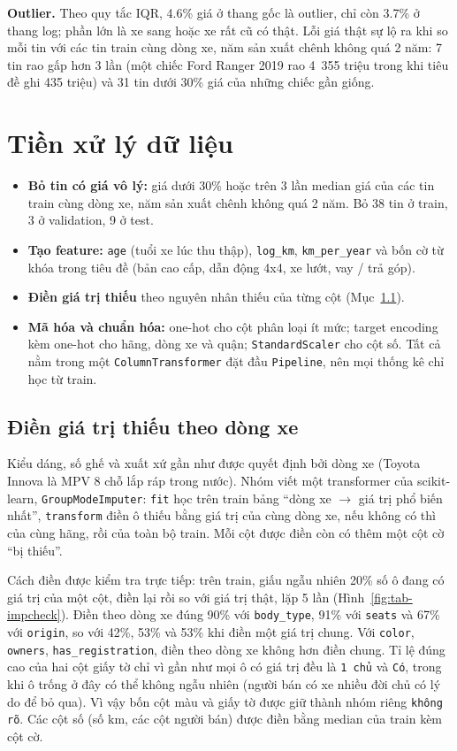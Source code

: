 \textbf{Outlier.} Theo quy tắc IQR, 4.6\% giá ở thang gốc là outlier, chỉ còn 3.7\% ở thang log; phần lớn là xe sang
hoặc xe rất cũ có thật. Lỗi giá thật sự lộ ra khi so mỗi tin với các tin train cùng dòng xe, năm sản xuất chênh không quá
2 năm: 7 tin rao gấp hơn 3 lần (một chiếc Ford Ranger 2019 rao 4~355 triệu trong khi tiêu đề ghi 435 triệu) và 31 tin
dưới 30\% giá của những chiếc gần giống.

\section{Tiền xử lý dữ liệu}\label{sec:tab-prep}

\begin{itemize}
  \item \textbf{Bỏ tin có giá vô lý:} giá dưới 30\% hoặc trên 3 lần median giá của các tin train cùng dòng xe, năm sản
        xuất chênh không quá 2 năm. Bỏ 38 tin ở train, 3 ở validation, 9 ở test.
  \item \textbf{Tạo feature:} \texttt{age} (tuổi xe lúc thu thập), \texttt{log\_km}, \texttt{km\_per\_year} và bốn cờ từ
        khóa trong tiêu đề (bản cao cấp, dẫn động 4x4, xe lướt, vay / trả góp).
  \item \textbf{Điền giá trị thiếu} theo nguyên nhân thiếu của từng cột (Mục~\ref{sec:tab-impute}).
  \item \textbf{Mã hóa và chuẩn hóa:} one-hot cho cột phân loại ít mức; target encoding \cite{tab-te} kèm one-hot cho
        hãng, dòng xe và quận; \texttt{StandardScaler} cho cột số. Tất cả nằm trong một \texttt{ColumnTransformer} đặt đầu
        \texttt{Pipeline}, nên mọi thống kê chỉ học từ train.
\end{itemize}

\subsection{Điền giá trị thiếu theo dòng xe}\label{sec:tab-impute}

Kiểu dáng, số ghế và xuất xứ gần như được quyết định bởi dòng xe (Toyota Innova là MPV 8 chỗ lắp ráp trong nước). Nhóm
viết một transformer của scikit-learn, \texttt{GroupModeImputer}: \texttt{fit} học trên train bảng ``dòng xe $\to$ giá
trị phổ biến nhất'', \texttt{transform} điền ô thiếu bằng giá trị của cùng dòng xe, nếu không có thì của cùng hãng, rồi
của toàn bộ train. Mỗi cột được điền còn có thêm một cột cờ ``bị thiếu''.

Cách điền được kiểm tra trực tiếp: trên train, giấu ngẫu nhiên 20\% số ô đang có giá trị của một cột, điền lại rồi so
với giá trị thật, lặp 5 lần (Hình~\ref{fig:tab-impcheck}). Điền theo dòng xe đúng 90\% với \texttt{body\_type}, 91\% với
\texttt{seats} và 67\% với \texttt{origin}, so với 42\%, 53\% và 53\% khi điền một giá trị chung. Với \texttt{color},
\texttt{owners}, \texttt{has\_registration}, điền theo dòng xe không hơn điền chung. Tỉ lệ đúng cao của hai cột giấy tờ
chỉ vì gần như mọi ô có giá trị đều là \texttt{1 chủ} và \texttt{Có}, trong khi ô trống ở đây có thể không ngẫu nhiên
(người bán có xe nhiều đời chủ có lý do để bỏ qua). Vì vậy bốn cột màu và giấy tờ được giữ thành nhóm riêng
\texttt{không rõ}. Các cột số (số km, các cột người bán) được điền bằng median của train kèm cột cờ.

